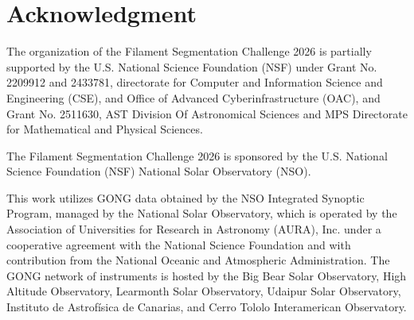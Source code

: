 \documentclass[sigconf]{acmart}
\begin{document}
\section{Acknowledgment}\label{sec:acknowledgment}
The organization of the Filament Segmentation Challenge 2026 is partially supported by the U.S. National Science Foundation (NSF) under Grant No. 2209912 and 2433781, directorate for Computer and Information Science and Engineering (CSE), and Office of Advanced Cyberinfrastructure (OAC), and Grant No. 2511630, AST Division Of Astronomical Sciences and MPS Directorate for Mathematical and Physical Sciences.

The Filament Segmentation Challenge 2026 is sponsored by the U.S. National Science Foundation (NSF) National Solar Observatory (NSO).

This work utilizes GONG data obtained by the NSO Integrated Synoptic Program, managed by the National Solar Observatory, which is operated by the Association of Universities for Research in Astronomy (AURA), Inc. under a cooperative agreement with the National Science Foundation and with contribution from the National Oceanic and Atmospheric Administration. The GONG network of instruments is hosted by the Big Bear Solar Observatory, High Altitude Observatory, Learmonth Solar Observatory, Udaipur Solar Observatory, Instituto de Astrofísica de Canarias, and Cerro Tololo Interamerican Observatory.



\end{document}
